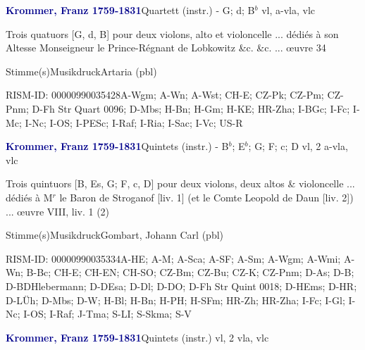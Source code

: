 \documentclass[twocolumn]{book}
\begin{document}
\par \vspace{7pt} \textcolor{darkblue}{\textbf{Krommer, Franz  1759-1831}}\hfillplus{\textbf{[297]}}\newline Quartett (instr.) - G; d; B$^b$ vl, a-vla, vlc
\par \begin{itshape}Trois quatuors [G, d, B] pour deux violons, alto et violoncelle ... dédiés à son Altesse Monseigneur le Prince-Régnant de Lobkowitz \&c. \&c. ... œuvre 34\end{itshape} 
\par \textcolor{darkblue}{}  Stimme(s)\newline Musikdruck\newline Artaria  (pbl)
\par RISM-ID: 00000990035428\newline A-Wgm; A-Wn; A-Wst; CH-E; CZ-Pk; CZ-Pm; CZ-Pnm; D-Fh  Str Quart 0096; D-Mbs; H-Bn; H-Gm; H-KE; HR-Zha; I-BGc; I-Fc; I-Mc; I-Nc; I-OS; I-PESc; I-Raf; I-Ria; I-Sac; I-Vc; US-R
\par \vspace{7pt} \textcolor{darkblue}{\textbf{Krommer, Franz  1759-1831}}\hfillplus{\textbf{[298]}}\newline Quintets (instr.) - B$^b$; E$^b$; G; F; c; D vl, 2 a-vla, vlc
\par \begin{itshape}Trois quintuors [B, Es, G; F, c, D] pour deux violons, deux altos \& violoncelle ... dédiés à M$^r$ le Baron de Stroganof [liv. 1] (et le Comte Leopold de Daun [liv. 2]) ... œuvre VIII, liv. 1 (2)\end{itshape} 
\par \textcolor{darkblue}{}  Stimme(s)\newline Musikdruck\newline Gombart, Johann Carl  (pbl)
\par RISM-ID: 00000990035334\newline A-HE; A-M; A-Sca; A-SF; A-Sm; A-Wgm; A-Wmi; A-Wn; B-Bc; CH-E; CH-EN; CH-SO; CZ-Bm; CZ-Bu; CZ-K; CZ-Pnm; D-As; D-B; D-BDHlebermann; D-DEsa; D-Dl; D-DO; D-Fh  Str Quint 0018; D-HEms; D-HR; D-LÜh; D-Mbs; D-W; H-Bl; H-Bn; H-PH; H-SFm; HR-Zh; HR-Zha; I-Fc; I-Gl; I-Nc; I-OS; I-Raf; J-Tma; S-LI; S-Skma; S-V
\par \vspace{7pt} \textcolor{darkblue}{\textbf{Krommer, Franz  1759-1831}}\hfillplus{\textbf{[299]}}\newline Quintets (instr.) vl, 2 vla, vlc
\end{document}
